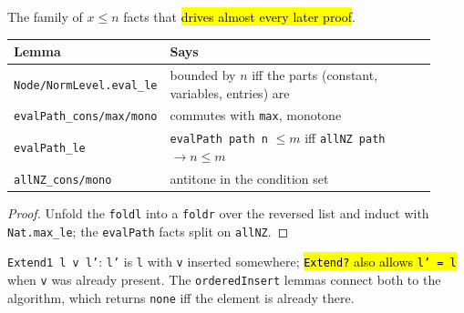 \begin{lemma}
\label{fam:lvl-eval-le}
\leanok
{}

 The family of $x \le n$ facts that \hl{drives almost every later proof}.
\begin{center}
\begin{tabular}{p{0.29\linewidth}p{0.63\linewidth}}
\toprule
Lemma & Says \\
\midrule
\texttt{Node/NormLevel.eval\_le} & bounded by $n$ iff the parts (constant, variables, entries) are \\
\texttt{evalPath\_cons/max/mono} & commutes with \texttt{max}, monotone \\
\texttt{evalPath\_le} & \texttt{evalPath path n} $\le m$ iff \texttt{allNZ path} $\to n\le m$ \\
\texttt{allNZ\_cons/mono} & antitone in the condition set \\
\bottomrule
\end{tabular}\par\smallskip
\end{center}
\end{lemma}
\begin{proof}
\leanok
{} Unfold the \texttt{foldl} into a \texttt{foldr} over the reversed list and induct with
\texttt{Nat.max\_le}; the \texttt{evalPath} facts split on \texttt{allNZ}.
\end{proof}

\begin{definition}
\label{def:lvl-extend}
\leanok
{}

 \texttt{Extend1 l v l'}: \texttt{l'} is \texttt{l} with \texttt{v} inserted
somewhere; \hl{\texttt{Extend?} also allows \texttt{l' = l}} when \texttt{v} was already present. The
\texttt{orderedInsert} lemmas connect both to the algorithm, which returns \texttt{none} iff the
element is already there.
\end{definition}

